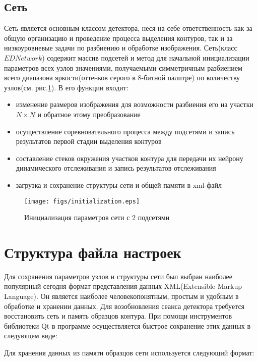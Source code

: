 \documentclass[a4paper,12pt]{report}
\begin{document}
\subsection{Сеть}
Сеть является основным классом детектора, неся на себе ответственность как за общую организацию и проведение процесса выделения контуров, так и за низкоуровневые задачи по разбиению и обработке изображения. Сеть(класс $EDNetwork$) содержит массив подсетей и метод для начальной инициализации параметров всех узлов значениями, получаемыми симметричным разбиением всего диапазона яркости(оттенков серого в 8-битной палитре) по количеству узлов(см. рис.\ref{initialization}). В его функции входит:
\begin{itemize}
\item{изменение размеров изображения для возможности разбиения его на участки $N\times N$ и обратное этому преобразование}
\item{осуществление соревновательного процесса между подсетями и запись результатов первой стадии выделения контуров}
\item{составление стеков окружения участков контура для передачи их нейрону динамического отслеживания и запись результатов отслеживания}
\item{загрузка и сохранение структуры сети и общей памяти в xml-файл}
\end{itemize}
\begin{center}
\begin{figure}[h]
\begin{center}
\texttt{[image: figs/initialization.eps]}
\end{center}\caption{Инициализация параметров сети с 2 подсетями}
\label{initialization}
\end{figure}
\end{center}

\section{Структура файла настроек}
Для сохранения параметров узлов и структуры сети был выбран наиболее популярный сегодня формат представления данных XML(Extensible Markup Language). Он является наиболее человекопонятным, простым и удобным в обработке и хранении данных. Для возобновления сеанса детектора требуется восстановить сеть и память образцов контура. При помощи инструментов библиотеки Qt в программе осуществляется быстрое сохранение этих данных в следующем виде:
\lstset{numbers=left,language=XML}

Для хранения данных из памяти образцов сети используется следующий формат:
\lstset{numbers=left,language=XML,firstnumber=14}

\end{document}

